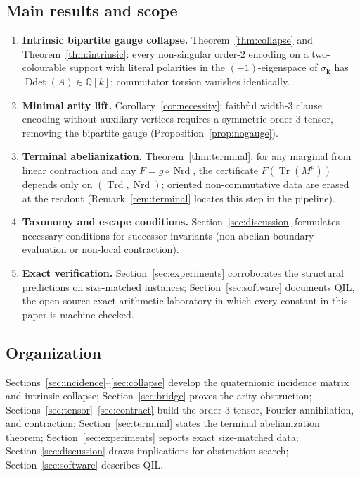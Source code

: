 \documentclass[pdflatex,sn-mathphys-num]{sn-jnl}
\theoremstyle{thmstyleone}%
\theoremstyle{thmstyletwo}%
\theoremstyle{thmstylethree}%
\newcommand{\QQ}{\mathbb{Q}}
\newcommand{\Nrd}{\operatorname{Nrd}}
\newcommand{\Trd}{\operatorname{Trd}}
\newcommand{\Tr}{\operatorname{Tr}}
\newcommand{\Ddet}{\operatorname{Ddet}}
\newcommand{\bk}{\mathbf{k}}
\begin{document}
\subsection{Main results and scope}\label{sec:contributions}

\begin{enumerate}[label=(\roman*)]
\item \textbf{Intrinsic bipartite gauge collapse.}
Theorem~\ref{thm:collapse} and Theorem~\ref{thm:intrinsic}: every
non-singular order-$2$ encoding on a two-colourable support with literal
polarities in the $(-1)$-eigenspace of $\sigma_{\bk}$ has
$\Ddet(A)\in\QQ[k]$; commutator torsion vanishes identically.
\item \textbf{Minimal arity lift.}
Corollary~\ref{cor:necessity}: faithful width-$3$ clause encoding without
auxiliary vertices requires a symmetric order-$3$ tensor, removing the
bipartite gauge (Proposition~\ref{prop:nogauge}).
\item \textbf{Terminal abelianization.}
Theorem~\ref{thm:terminal}: for any marginal from linear contraction and
any $F=g\circ\Nrd$, the certificate $F(\Tr(M^p))$ depends only on
$(\Trd,\Nrd)$; oriented non-commutative data are erased at the readout
(Remark~\ref{rem:terminal} locates this step in the pipeline).
\item \textbf{Taxonomy and escape conditions.}
Section~\ref{sec:discussion} formulates necessary conditions for successor
invariants (non-abelian boundary evaluation or non-local contraction).
\item \textbf{Exact verification.}
Section~\ref{sec:experiments} corroborates the structural predictions on
size-matched instances; Section~\ref{sec:software} documents QIL, the
open-source exact-arithmetic laboratory in which every constant in this
paper is machine-checked.
\end{enumerate}

\subsection{Organization}

Sections~\ref{sec:incidence}--\ref{sec:collapse} develop the quaternionic
incidence matrix and intrinsic collapse; Section~\ref{sec:bridge} proves the
arity obstruction; Sections~\ref{sec:tensor}--\ref{sec:contract} build
the order-$3$ tensor, Fourier annihilation, and contraction; Section~\ref{sec:terminal}
states the terminal abelianization theorem; Section~\ref{sec:experiments}
reports exact size-matched data; Section~\ref{sec:discussion} draws
implications for obstruction search; Section~\ref{sec:software} describes QIL.
\end{document}
